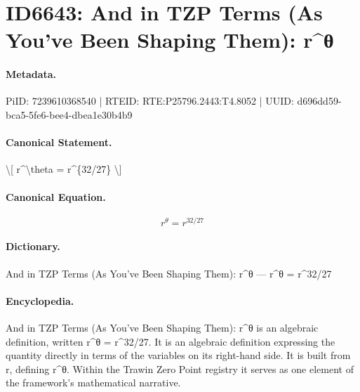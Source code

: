 \section*{ID6643: And in TZP Terms (As You’ve Been Shaping Them): r\textasciicircum{}θ}
\paragraph{Metadata.}
PiID: 7239610368540 | RTEID: RTE:P25796.2443:T4.8052 | UUID: d696dd59-bca5-5fe6-bee4-dbea1e30b4b9

\paragraph{Canonical Statement.}
\textbackslash{}[ r\textasciicircum{}\textbackslash{}theta = r\textasciicircum{}\{32/27\} \textbackslash{}]

\paragraph{Canonical Equation.}
\[
r^\theta = r^{32/27}
\]

\paragraph{Dictionary.}
And in TZP Terms (As You’ve Been Shaping Them): r\textasciicircum{}θ — r\textasciicircum{}θ = r\textasciicircum{}32/27

\paragraph{Encyclopedia.}
And in TZP Terms (As You’ve Been Shaping Them): r\textasciicircum{}θ is an algebraic definition, written r\textasciicircum{}θ = r\textasciicircum{}32/27. It is an algebraic definition expressing the quantity directly in terms of the variables on its right-hand side. It is built from r, defining r\textasciicircum{}θ. Within the Trawin Zero Point registry it serves as one element of the framework's mathematical narrative.
